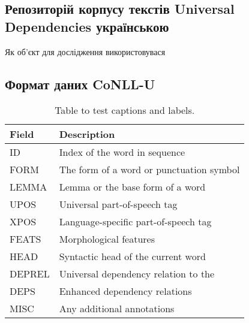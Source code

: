 \subsection{Репозиторій корпусу текстів Universal Dependencies українською}
Як об'єкт для дослідження використовувася \cite{bib3}

\subsection{Формат даних CoNLL-U}

\begin{table}[h]
\begin{tabular}{|l|l|}
\hline
  Field   & Description \\ \hline
ID        & Index of the word in sequence \\ \hline
FORM      & The form of a word or punctuation symbol \\ \hline
LEMMA     & Lemma or the base form of a word \\ \hline
UPOS      & Universal part-of-speech tag \\ \hline
XPOS      & Language-specific part-of-speech tag \\ \hline
FEATS     & Morphological features \\ \hline
HEAD      & Syntactic head of the current word \\ \hline
DEPREL    & Universal dependency relation to the \\ \hline
DEPS      & Enhanced dependency relations \\ \hline
MISC      & Any additional annotations \\ \hline
\end{tabular}
\caption{Table to test captions and labels.}
\label{table:1}
\end{table}